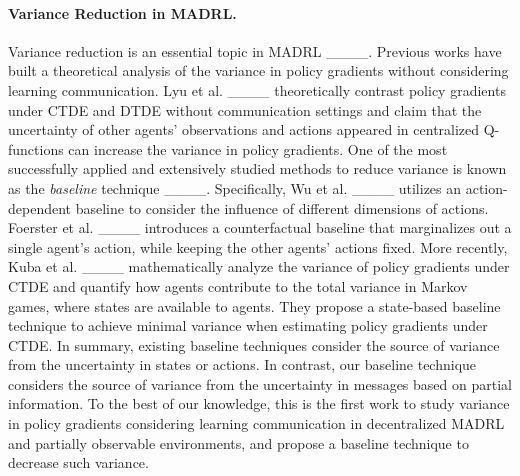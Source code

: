 \paragraph{\textnormal{\textbf{Variance Reduction in MADRL}}.} Variance reduction is an essential topic in MADRL ____. Previous works have built a theoretical analysis of the variance in policy gradients without considering learning communication. Lyu et al. ____ theoretically contrast policy gradients under CTDE and DTDE without communication settings and claim that the uncertainty of other agents' observations and actions appeared in centralized Q-functions can increase the variance in policy gradients. One of the most successfully applied and extensively studied methods to reduce variance is known as the \textit{baseline} technique ____. Specifically, Wu et al. ____ utilizes an action-dependent baseline to consider the influence of different dimensions of actions. Foerster et al. ____ introduces a counterfactual baseline that marginalizes out a single agent’s action, while keeping the other agents’ actions fixed. More recently, Kuba et al. ____ mathematically analyze the variance of policy gradients under CTDE and quantify how agents contribute to the total variance in Markov games, where states are available to agents. They propose a state-based baseline technique to achieve minimal variance when estimating policy gradients under CTDE. In summary, existing baseline techniques consider the source of variance from the uncertainty in states or actions. In contrast, our baseline technique considers the source of variance from the uncertainty in messages based on partial information. To the best of our knowledge, this is the first work to study variance in policy gradients considering learning communication in decentralized MADRL and partially observable environments, and propose a baseline technique to decrease such variance.